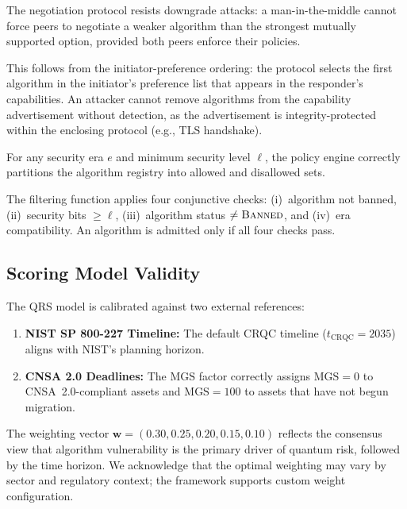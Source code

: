 \documentclass[conference,10pt]{IEEEtran}
\newcommand{\mgs}{\textrm{MGS}}
\begin{document}
\begin{property}
The negotiation protocol resists downgrade attacks: a man-in-the-middle
cannot force peers to negotiate a weaker algorithm than the strongest
mutually supported option, provided both peers enforce their policies.
\end{property}

This follows from the initiator-preference ordering: the protocol
selects the first algorithm in the initiator's preference list that
appears in the responder's capabilities. An attacker cannot remove
algorithms from the capability advertisement without detection, as the
advertisement is integrity-protected within the enclosing protocol
(e.g., TLS handshake).

\begin{property}
For any security era $e$ and minimum security level $\ell$, the policy
engine correctly partitions the algorithm registry into allowed and
disallowed sets.
\end{property}

The filtering function applies four conjunctive checks: (i)~algorithm
not banned, (ii)~security bits $\geq \ell$, (iii)~algorithm status
$\neq \textsc{Banned}$, and (iv)~era compatibility. An algorithm is
admitted only if all four checks pass.

\subsection{Scoring Model Validity}

The QRS model is calibrated against two external references:

\begin{enumerate}[leftmargin=*]
\item \textbf{NIST SP 800-227 Timeline:} The default CRQC timeline
  ($t_\text{CRQC} = 2035$) aligns with NIST's planning horizon.
\item \textbf{CNSA 2.0 Deadlines:} The $\mgs$ factor correctly
  assigns $\mgs = 0$ to CNSA~2.0-compliant assets and $\mgs = 100$
  to assets that have not begun migration.
\end{enumerate}

The weighting vector $\mathbf{w} = (0.30, 0.25, 0.20, 0.15, 0.10)$
reflects the consensus view that algorithm vulnerability is the primary
driver of quantum risk, followed by the time horizon. We acknowledge
that the optimal weighting may vary by sector and regulatory context;
the framework supports custom weight configuration.
\end{document}
